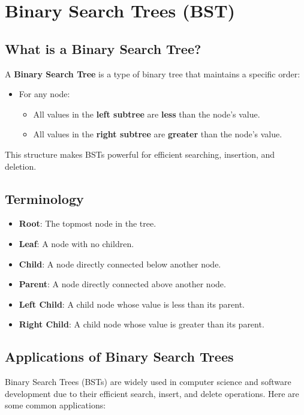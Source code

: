 \section{Binary Search Trees (BST)}

\subsection{What is a Binary Search Tree?}
A \textbf{Binary Search Tree} is a type of binary tree that maintains a specific order:
\begin{itemize}
    \item For any node:
    \begin{itemize}
        \item All values in the \textbf{left subtree} are \textbf{less} than the node's value.
        \item All values in the \textbf{right subtree} are \textbf{greater} than the node's value.
    \end{itemize}
\end{itemize}
This structure makes BSTs powerful for efficient searching, insertion, and deletion.

\subsection{Terminology}
\begin{itemize}
    \item \textbf{Root}: The topmost node in the tree.
    \item \textbf{Leaf}: A node with no children.
    \item \textbf{Child}: A node directly connected below another node.
    \item \textbf{Parent}: A node directly connected above another node.
    \item \textbf{Left Child}: A child node whose value is less than its parent.
    \item \textbf{Right Child}: A child node whose value is greater than its parent.
\end{itemize}

\subsection{Applications of Binary Search Trees}

Binary Search Trees (BSTs) are widely used in computer science and software development due to their efficient search, insert, and delete operations. Here are some common applications:

